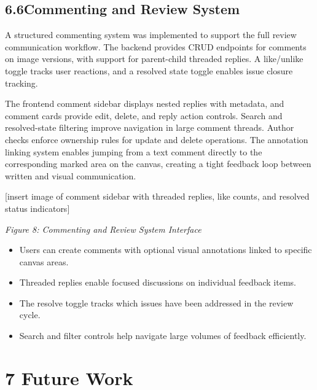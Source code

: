 \documentclass[12pt,a4paper]{article}
\begin{document}
\subsection{6.6\quad Commenting and Review System}

A structured commenting system was implemented to support the full review communication workflow. The backend provides CRUD endpoints for comments on image versions, with support for parent-child threaded replies. A like/unlike toggle tracks user reactions, and a resolved state toggle enables issue closure tracking.

The frontend comment sidebar displays nested replies with metadata, and comment cards provide edit, delete, and reply action controls. Search and resolved-state filtering improve navigation in large comment threads. Author checks enforce ownership rules for update and delete operations. The annotation linking system enables jumping from a text comment directly to the corresponding marked area on the canvas, creating a tight feedback loop between written and visual communication.

[insert image of comment sidebar with threaded replies, like counts, and resolved status indicators]

\textit{Figure 8: Commenting and Review System Interface}

\begin{itemize}
    \item Users can create comments with optional visual annotations linked to specific canvas areas.
    \item Threaded replies enable focused discussions on individual feedback items.
    \item The resolve toggle tracks which issues have been addressed in the review cycle.
    \item Search and filter controls help navigate large volumes of feedback efficiently.
\end{itemize}

\section{7 Future Work}
\end{document}
